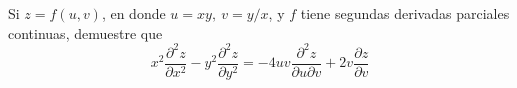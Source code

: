 \item Si $z = f(u, v)$, en donde $u = xy, \ v = y/x$, y $f$ tiene segundas derivadas parciales continuas, demuestre que
\[ x^2 \frac{\partial^2 z}{\partial x^2} - y^2 \frac{\partial^2 z}{\partial y^2} = -4uv \frac{\partial^2 z}{\partial u \partial v} + 2v \frac{\partial z}{\partial v} \]

